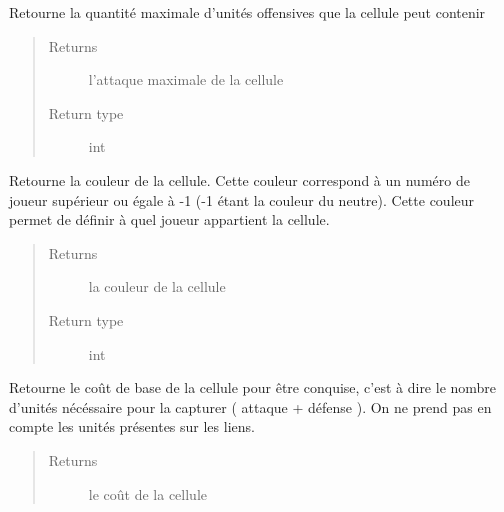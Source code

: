 \documentclass[letterpaper,10pt,english]{sphinxmanual}
\begin{document}
\begin{fulllineitems}
\begin{fulllineitems}
\label{index:Cellule.Cellule.getAttaqueMax}
Retourne la quantité maximale d'unités offensives que la cellule peut contenir
\begin{quote}\begin{description}
\item[{Returns}] \leavevmode
l'attaque maximale de la cellule

\item[{Return type}] \leavevmode
int

\end{description}\end{quote}

\end{fulllineitems}


\begin{fulllineitems}
\label{index:Cellule.Cellule.getCouleur}
Retourne la couleur de la cellule. Cette couleur correspond à un numéro de joueur supérieur ou égale à -1 (-1 étant la couleur du neutre).
Cette couleur permet de définir à quel joueur appartient la cellule.
\begin{quote}\begin{description}
\item[{Returns}] \leavevmode
la couleur de la cellule

\item[{Return type}] \leavevmode
int

\end{description}\end{quote}

\end{fulllineitems}


\begin{fulllineitems}
\label{index:Cellule.Cellule.getCout}
Retourne le coût de base de la cellule pour être conquise, c'est à dire le nombre d'unités nécéssaire pour la capturer ( attaque + défense ).
On ne prend pas en compte les unités présentes sur les liens.
\begin{quote}\begin{description}
\item[{Returns}] \leavevmode
le coût de la cellule


\end{description}
\end{quote}
\end{fulllineitems}
\end{fulllineitems}
\end{document}
